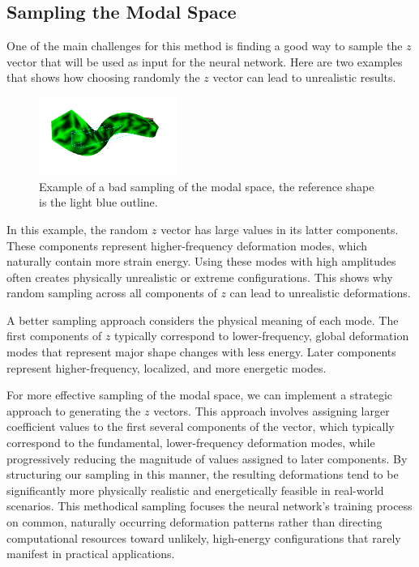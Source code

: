 \subsection{Sampling the Modal Space}
One of the main challenges for this method is finding a good way to sample the \(z\) vector that will be used as input for the neural network. Here are two examples that shows how choosing randomly the \(z\) vector can lead to unrealistic results. 
\begin{figure}[H]
    \centering
    \includegraphics[width=0.4\textwidth]{Images/z_random.png}
    \caption{Example of a bad sampling of the modal space, the reference shape is the light blue outline.}
    \label{fig:bad_sampling}
\end{figure}
In this example, the random \(z\) vector has large values in its latter components. These components represent higher-frequency deformation modes, which naturally contain more strain energy. Using these modes with high amplitudes often creates physically unrealistic or extreme configurations. This shows why random sampling across all components of \(z\) can lead to unrealistic deformations.

A better sampling approach considers the physical meaning of each mode. The first components of \(z\) typically correspond to lower-frequency, global deformation modes that represent major shape changes with less energy. Later components represent higher-frequency, localized, and more energetic modes. 

For more effective sampling of the modal space, we can implement a strategic approach to generating the \(z\) vectors. This approach involves assigning larger coefficient values to the first several components of the vector, which typically correspond to the fundamental, lower-frequency deformation modes, while progressively reducing the magnitude of values assigned to later components. By structuring our sampling in this manner, the resulting deformations tend to be significantly more physically realistic and energetically feasible in real-world scenarios. This methodical sampling focuses the neural network's training process on common, naturally occurring deformation patterns rather than directing computational resources toward unlikely, high-energy configurations that rarely manifest in practical applications.

